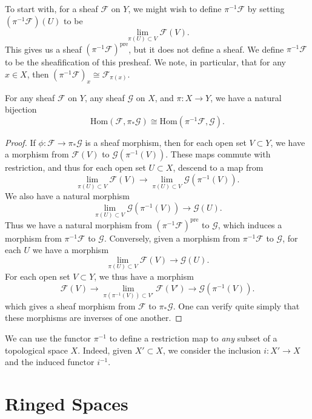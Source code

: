 To start with, for a sheaf $\mathcal{F}$ on $Y$, we might wish to define $\pi^{-1} \mathcal{F}$ by setting $(\pi^{-1} \mathcal{F})(U)$ to be
%
\[ \lim_{\pi(U) \subset V} \mathcal{F}(V). \]
%
This gives us a sheaf $(\pi^{-1} \mathcal{F})^{\text{pre}}$, but it does not define a sheaf. We define $\pi^{-1} \mathcal{F}$ to be the sheafification of this presheaf. We note, in particular, that for any $x \in X$, then $(\pi^{-1} \mathcal{F})_x \cong \mathcal{F}_{\pi(x)}$.

\begin{lemma}
    For any sheaf $\mathcal{F}$ on $Y$, any sheaf $\mathcal{G}$ on $X$, and $\pi: X \to Y$, we have a natural bijection
    \[ \text{Hom}(\mathcal{F}, \pi_* \mathcal{G}) \cong \text{Hom}(\pi^{-1} \mathcal{F}, \mathcal{G}). \]
\end{lemma}
\begin{proof}
    If $\phi: \mathcal{F} \to \pi_* \mathcal{G}$ is a sheaf morphism, then for each open set $V \subset Y$, we have a morphism from $\mathcal{F}(V)$ to $\mathcal{G}(\pi^{-1}(V))$. These maps commute with restriction, and thus for each open set $U \subset X$, descend to a map from
    \[ \lim_{\pi(U) \subset V} \mathcal{F}(V) \to \lim_{\pi(U) \subset V} \mathcal{G}(\pi^{-1}(V)). \]
    We also have a natural morphism
    \[ \lim_{\pi(U) \subset V} \mathcal{G}(\pi^{-1}(V)) \to \mathcal{G}(U). \]
    Thus we have a natural morphism from $(\pi^{-1} \mathcal{F})^{\text{pre}}$ to $\mathcal{G}$, which induces a morphism from $\pi^{-1} \mathcal{F}$ to $\mathcal{G}$. Conversely, given a morphism from $\pi^{-1} \mathcal{F}$ to $\mathcal{G}$, for each $U$ we have a morphism
    \[ \lim_{\pi(U) \subset V} \mathcal{F}(V) \to \mathcal{G}(U). \]
    For each open set $V \subset Y$, we thus have a morphism
    \[ \mathcal{F}(V) \to \lim_{\pi(\pi^{-1}(V)) \subset V'} \mathcal{F}(V') \to \mathcal{G}(\pi^{-1}(V)). \]
    which gives a sheaf morphism from $\mathcal{F}$ to $\pi_* \mathcal{G}$. One can verify quite simply that these morphisms are inverses of one another.
\end{proof}

We can use the functor $\pi^{-1}$ to define a restriction map to \emph{any} subset of a topological space $X$. Indeed, given $X' \subset X$, we consider the inclusion $i: X' \to X$ and the induced functor $i^{-1}$.

\section{Ringed Spaces}

